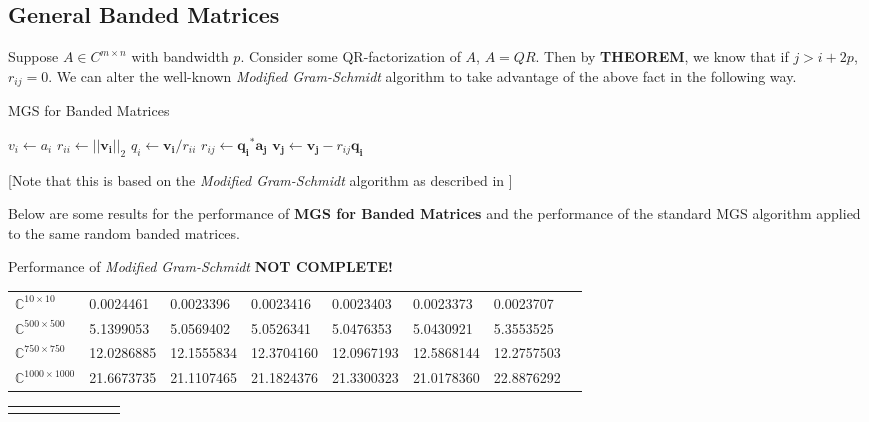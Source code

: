 \documentclass{article}
\numberwithin{pic}{section}
\numberwithin{lem}{section}
\numberwithin{thm}{section}
\numberwithin{cor}{section}
\theoremstyle{definition}
\numberwithin{ex}{section}
\numberwithin{defn}{section}
\theoremstyle{definition}
\theoremstyle{remark}
\newcommand{\set}[1]{\ensuremath{\left\{ #1\right\}}} %
\newcommand{\C}{\ensuremath{\mathbb{C}}} %
\newcommand{\norm}[1]{\ensuremath{\left | \left | #1 \right | \right |}}
\begin{document}
\subsection{General Banded Matrices}
Suppose $A\in C^{m\times n}$ with bandwidth $p$. Consider some QR-factorization
of $A$, $A = QR$. Then by \textbf{THEOREM}, we
know that if $j > i + 2p$, $r_{ij} = 0$. We can alter the well-known
\textit{Modified Gram-Schmidt} algorithm to take advantage of the above fact in
the following way.
\begin{algorithm}[H]
  \caption{MGS for Banded Matrices}
  \begin{algorithmic}[1]
   	\State$v_i\gets a_i$
    \EndFor
    \State$r_{ii}\gets \norm{\mathbf{v_i}}_2$
    \State$q_i\gets \mathbf{v_i} / r_{ii}$
    \For{$j = i + 1$\textbf{ to }$\text{min}\set{i + 2p, n}$}
    \State$r_{ij}\gets \mathbf{q_i}^*\mathbf{a_j}$
    \State$\mathbf{v_j}\gets\mathbf{v_j} - r_{ij}\mathbf{q_i}$
    \EndFor
    \EndFor
  \end{algorithmic}
  [Note that this is based on the \textit{Modified
    Gram-Schmidt} algorithm as described in \cite{nla}] 
\end{algorithm}
Below are some results for the performance of \textbf{MGS for Banded Matrices}
and the performance of the standard MGS algorithm applied to the same random
banded matrices.
\begin{center}
 Performance of \textit{Modified Gram-Schmidt} \textbf{NOT COMPLETE!}
\begin{tabular}{p{2cm}|p{2cm}p{2cm}p{2cm}p{2cm}p{2cm}p{2cm}p{2cm}}
    $\C^{10\times 10}$ & 0.0024461 &   0.0023396 &   0.0023416 &   0.0023403  &  0.0023373  &  0.0023707\\
    $\C^{500\times 500}$& 5.1399053  &  5.0569402   & 5.0526341  &  5.0476353 &   5.0430921  &  5.3553525\\
   $\C^{750\times 750}$& 12.0286885  & 12.1555834  & 12.3704160  & 12.0967193 &  12.5868144  & 12.2757503\\
  $\C^{1000\times 1000}$& 21.6673735  & 21.1107465  & 21.1824376  & 21.3300323  & 21.0178360  & 22.8876292 
\end{tabular}
\end{center}
\begin{center}
  \begin{tabular}{p{1cm}|p{2cm}p{2cm}p{2cm}p{2cm}p{2cm}p{2cm}p{2cm}}
    & & & & & &
  \end{tabular}
\end{center}
\end{document}
